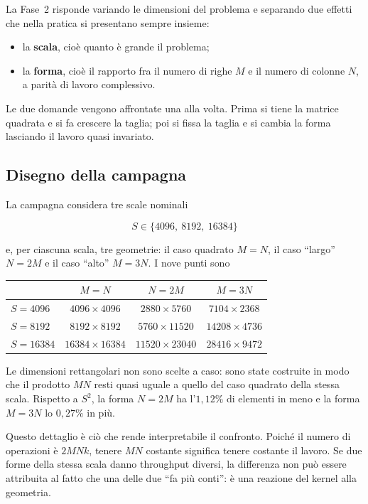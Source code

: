 La Fase~2 risponde variando le dimensioni del problema e separando due effetti
che nella pratica si presentano sempre insieme:

\begin{itemize}
  \item la \textbf{scala}, cioè quanto è grande il problema;
  \item la \textbf{forma}, cioè il rapporto fra il numero di righe $M$ e il
  numero di colonne $N$, a parità di lavoro complessivo.
\end{itemize}

Le due domande vengono affrontate una alla volta. Prima si tiene la matrice
quadrata e si fa crescere la taglia; poi si fissa la taglia e si cambia la
forma lasciando il lavoro quasi invariato.


\subsection{Disegno della campagna}
\label{sec:ris-fase2-disegno}

La campagna considera tre scale nominali

\[
S \in \{4096,\ 8192,\ \num{16384}\}
\]

e, per ciascuna scala, tre geometrie: il caso quadrato $M=N$, il caso
``largo'' $N=2M$ e il caso ``alto'' $M=3N$. I nove punti sono

\begin{center}
\footnotesize
\begin{tabular}{@{}lccc@{}}
\toprule
& $M=N$ & $N=2M$ & $M=3N$ \\
\midrule
$S=4096$  & $4096\times4096$   & $2880\times5760$   & $7104\times2368$ \\
$S=8192$  & $8192\times8192$   & $5760\times\num{11520}$  & $\num{14208}\times4736$ \\
$S=\num{16384}$ & $\num{16384}\times\num{16384}$ & $\num{11520}\times\num{23040}$ & $\num{28416}\times9472$ \\
\bottomrule
\end{tabular}
\end{center}

Le dimensioni rettangolari non sono scelte a caso: sono state costruite in modo
che il prodotto $MN$ resti quasi uguale a quello del caso quadrato della stessa
scala. Rispetto a $S^2$, la forma $N=2M$ ha l'$1{,}12\%$ di elementi in meno e
la forma $M=3N$ lo $0{,}27\%$ in più.

Questo dettaglio è ciò che rende interpretabile il confronto. Poiché il numero
di operazioni è
$2MNk$,
tenere $MN$ costante significa tenere costante il lavoro. Se due forme della
stessa scala danno throughput diversi, la differenza non può essere attribuita
al fatto che una delle due ``fa più conti'': è una reazione del kernel alla
geometria.

